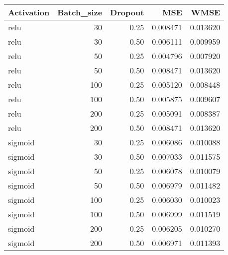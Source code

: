 \begin{tabular}{lrrrr}
\toprule
Activation &  Batch\_size &  Dropout &      MSE &     WMSE \\
\midrule
      relu &          30 &     0.25 & 0.008471 & 0.013620 \\
      relu &          30 &     0.50 & 0.006111 & 0.009959 \\
      relu &          50 &     0.25 & 0.004796 & 0.007920 \\
      relu &          50 &     0.50 & 0.008471 & 0.013620 \\
      relu &         100 &     0.25 & 0.005120 & 0.008448 \\
      relu &         100 &     0.50 & 0.005875 & 0.009607 \\
      relu &         200 &     0.25 & 0.005091 & 0.008387 \\
      relu &         200 &     0.50 & 0.008471 & 0.013620 \\
   sigmoid &          30 &     0.25 & 0.006086 & 0.010088 \\
   sigmoid &          30 &     0.50 & 0.007033 & 0.011575 \\
   sigmoid &          50 &     0.25 & 0.006078 & 0.010079 \\
   sigmoid &          50 &     0.50 & 0.006979 & 0.011482 \\
   sigmoid &         100 &     0.25 & 0.006030 & 0.010023 \\
   sigmoid &         100 &     0.50 & 0.006999 & 0.011519 \\
   sigmoid &         200 &     0.25 & 0.006205 & 0.010270 \\
   sigmoid &         200 &     0.50 & 0.006971 & 0.011393 \\
\bottomrule
\end{tabular}
